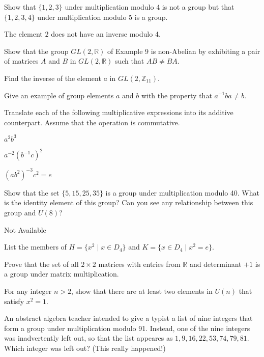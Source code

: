 \documentclass[11pt,largemargins]{homework}
\begin{document}
\question
Show that $\{1, 2, 3\}$ under multiplication modulo 4 is not a group but that $\{1,2,3,4\}$ under multiplication 
modulo 5 is a group.

\quad The element $2$ does not have an inverse modulo 4.

\question
Show that the group $GL(2, \mathbb{R})$ of Example 9 is non-Abelian by exhibiting a pair of matrices $A$ and $B$ 
in $GL(2, \mathbb{R})$ such that $AB \neq BA$.

\question
Find the inverse of the element $a$ in $GL(2, \mathbb{Z}_{11})$.

\question
Give an example of group elements $a$ and $b$ with the property that $a^{-1}ba\neq b$.

\question
Translate each of the following multiplicative expressions into its additive counterpart. Assume that the operation 
is commutative.

\begin{alphaparts}
    \questionpart
    $a^2b^3$

    \questionpart
    $a^{-2}(b^{-1}c)^2$

    \questionpart
    $(ab^2)^{-3}c^2=e$

\end{alphaparts}

\question
Show that the set $\{5, 15, 25, 35\}$ is a group under multiplication modulo 40. What is the identity element of this group?
Can you see any relationship between this group and $U(8)$?

\question
Not Available

\question
List the members of $H=\{x^2\;|\; x \in D_4 \}$ and $K=\{x\in D_4 \;|\; x^2=e \}$.

\question
Prove that the set of all $2\times2$ matrices with entries from $\mathbb{R}$ and determinant $+1$ is a group under matrix
multiplication.

\question
For any integer $n>2$, show that there are at least two elements in $U(n)$ that satisfy $x^2=1$.

\question
An abstract algebra teacher intended to give a typist a list of nine integers that form a group under multiplication 
modulo 91. Instead, one of the nine integers was inadvertently left out, so that the list appeares as 
$1, 9, 16, 22, 53, 74, 79, 81$. Which integer was left out? (This really happened!)
\end{document}
